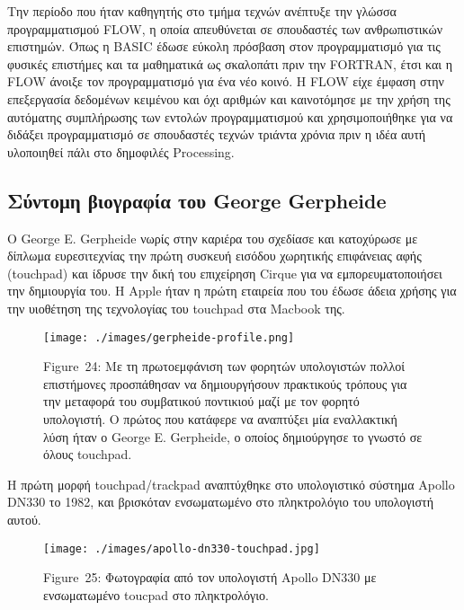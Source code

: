 \documentclass[
]{article}
\begin{document}
Την περίοδο που ήταν καθηγητής στο τμήμα τεχνών ανέπτυξε την γλώσσα
προγραμματισμού FLOW, η οποία απευθύνεται σε σπουδαστές των
ανθρωπιστικών επιστημών. Όπως η BASIC έδωσε εύκολη πρόσβαση στον
προγραμματισμό για τις φυσικές επιστήμες και τα μαθηματικά ως σκαλοπάτι
πριν την FORTRAN, έτσι και η FLOW άνοιξε τον προγραμματισμό για ένα νέο
κοινό. Η FLOW είχε έμφαση στην επεξεργασία δεδομένων κειμένου και όχι
αριθμών και καινοτόμησε με την χρήση της αυτόματης συμπλήρωσης των
εντολών προγραμματισμού και χρησιμοποιήθηκε για να διδάξει
προγραμματισμό σε σπουδαστές τεχνών τριάντα χρόνια πριν η ιδέα αυτή
υλοποιηθεί πάλι στο δημοφιλές Processing.

\hypertarget{ux3c3ux3cdux3bdux3c4ux3bfux3bcux3b7-ux3b2ux3b9ux3bfux3b3ux3c1ux3b1ux3c6ux3afux3b1-ux3c4ux3bfux3c5-george-gerpheide}{%
\subsection{Σύντομη βιογραφία του George
Gerpheide}\label{ux3c3ux3cdux3bdux3c4ux3bfux3bcux3b7-ux3b2ux3b9ux3bfux3b3ux3c1ux3b1ux3c6ux3afux3b1-ux3c4ux3bfux3c5-george-gerpheide}}

Ο George E. Gerpheide νωρίς στην καριέρα του σχεδίασε και κατοχύρωσε με
δίπλωμα ευρεσιτεχνίας την πρώτη συσκευή εισόδου χωρητικής επιφάνειας
αφής (touchpad) και ίδρυσε την δική του επιχείρηση Cirque για να
εμπορευματοποιήσει την δημιουργία του. Η Apple ήταν η πρώτη εταιρεία που
του έδωσε άδεια χρήσης για την υιοθέτηση της τεχνολογίας του touchpad
στα Macbook της.

\leavevmode{}%
\begin{figure}
\hypertarget{fig:george-gerpheide}{%
\centering
\texttt{[image: ./images/gerpheide-profile.png]}
\caption{Figure~24: Με τη πρωτοεμφάνιση των φορητών υπολογιστών πολλοί
επιστήμονες προσπάθησαν να δημιουργήσουν πρακτικούς τρόπους για την
μεταφορά του συμβατικού ποντικιού μαζί με τον φορητό υπολογιστή. Ο
πρώτος που κατάφερε να αναπτύξει μία εναλλακτική λύση ήταν ο George E.
Gerpheide, ο οποίος δημιούργησε το γνωστό σε όλους
touchpad.}\label{fig:george-gerpheide}
}
\end{figure}

Η πρώτη μορφή touchpad/trackpad αναπτύχθηκε στο υπολογιστικό σύστημα
Apollo DN330 το 1982, και βρισκόταν ενσωματωμένο στο πληκτρολόγιο του
υπολογιστή αυτού.

\leavevmode{}%
\begin{figure}
\hypertarget{fig:apollo-dn330-touchpad}{%
\centering
\texttt{[image: ./images/apollo-dn330-touchpad.jpg]}
\caption{Figure~25: Φωτογραφία από τον υπολογιστή Apollo DN330 με
ενσωματωμένο toucpad στο πληκτρολόγιο.}\label{fig:apollo-dn330-touchpad}
}
\end{figure}
\end{document}
